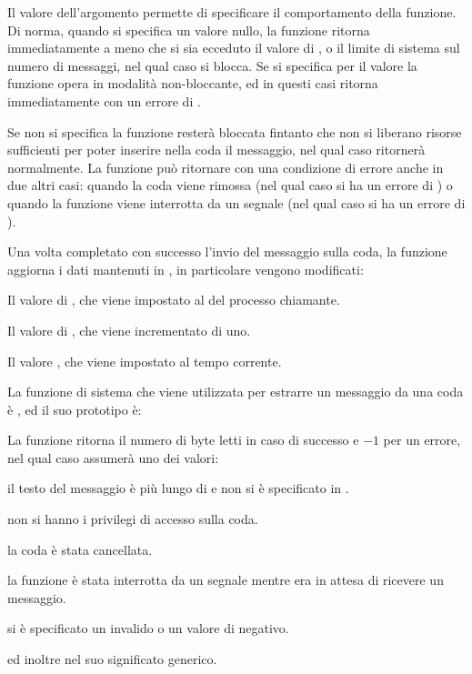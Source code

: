 Il valore dell'argomento  permette di specificare il comportamento
della funzione. Di norma, quando si specifica un valore nullo, la funzione
ritorna immediatamente a meno che si sia ecceduto il valore di
, o il limite di sistema sul numero di messaggi, nel qual
caso si blocca.  Se si specifica per  il valore
 la funzione opera in modalità non-bloccante, ed in questi
casi ritorna immediatamente con un errore di .

Se non si specifica  la funzione resterà bloccata fintanto
che non si liberano risorse sufficienti per poter inserire nella coda il
messaggio, nel qual caso ritornerà normalmente. La funzione può ritornare con
una condizione di errore anche in due altri casi: quando la coda viene rimossa
(nel qual caso si ha un errore di ) o quando la funzione viene
interrotta da un segnale (nel qual caso si ha un errore di ).

Una volta completato con successo l'invio del messaggio sulla coda, la
funzione aggiorna i dati mantenuti in , in particolare
vengono modificati:
\begin{itemize*}
\item Il valore di , che viene impostato al  del
  processo chiamante.
\item Il valore di , che viene incrementato di uno.
\item Il valore , che viene impostato al tempo corrente.
\end{itemize*}

La funzione di sistema che viene utilizzata per estrarre un messaggio da una
coda è , ed il suo prototipo è:

\begin{funcproto}{
}

{La funzione ritorna il numero di byte letti in caso di successo e $-1$ per un
  errore, nel qual caso  assumerà uno dei valori:
  \begin{errlist}
  \item[\errcode{E2BIG}] il testo del messaggio è più lungo di  e
    non si è specificato  in .
  \item[\errcode{EACCES}] non si hanno i privilegi di accesso sulla coda.
  \item[\errcode{EIDRM}] la coda è stata cancellata.
  \item[\errcode{EINTR}] la funzione è stata interrotta da un segnale mentre
    era in attesa di ricevere un messaggio.
  \item[\errcode{EINVAL}] si è specificato un  invalido o un
    valore di  negativo.
  \end{errlist}
  ed inoltre  nel suo significato generico.}
\end{funcproto}


